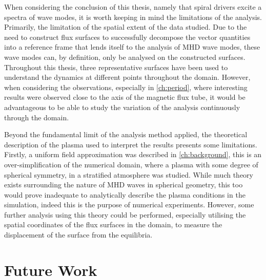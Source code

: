 When considering the conclusion of this thesis, namely that spiral drivers excite a spectra of wave modes, it is worth keeping in mind the limitations of the analysis.
Primarily, the limitation of the spatial extent of the data studied.
Due to the need to construct flux surfaces to successfully decompose the vector quantities into a reference frame that lends itself to the analysis of MHD wave modes, these wave modes can, by definition, only be analysed on the constructed surfaces.
Throughout this thesis, three representative surfaces have been used to understand the dynamics at different points throughout the domain.
However, when considering the observations, especially in \cref{ch:period}, where interesting results were observed close to the axis of the magnetic flux tube, it would be advantageous to be able to study the variation of the analysis continuously through the domain.

Beyond the fundamental limit of the analysis method applied, the theoretical description of the plasma used to interpret the results presents some limitations.
Firstly, a uniform field approximation was described in \cref{ch:background}, this is an over-simplification of the numerical domain, where a plasma with some degree of spherical symmetry, in a stratified atmosphere was studied.
While much theory exists surrounding the nature of MHD waves in spherical geometry, this too would prove inadequate to analytically describe the plasma conditions in the simulation, indeed this is the purpose of numerical experiments.
However, some further analysis using this theory could be performed, especially utilising the spatial coordinates of the flux surfaces in the domain, to measure the displacement of the surface from the equilibria.

\section{Future Work}

